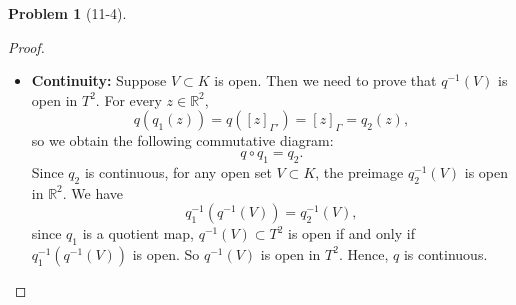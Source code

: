 \documentclass[11pt, a4paper]{article}
\theoremstyle{definition}
\newtheorem{prob}{Problem}
\newenvironment{problem}[1][]{\begin{prob}[#1]\normalfont}{\end{prob}\vspace{1.5em}}
\begin{document}
\begin{problem}[11-4]
\begin{proof}
\begin{itemize}
    \begin{enumerate}
        \item \textbf{$[z_1]_{\Gamma'} \subseteq [z_0]_{\Gamma'}$:} Take arbitrary element of $[z_1]_{\Gamma'}$, which is $\delta(z_1)$ for some $\delta \in \Gamma'$. Substituting $z_1 = \gamma'(z_0)$:
        $$\delta(z_1) = \delta(\gamma'(z_0)) = (\delta \gamma')(z_0)$$
        Since $\Gamma'$ is a group, $\delta \gamma' \in \Gamma'$, hence
        $$\delta(z_1) \in \Gamma' \cdot z_0 = [z_0]_{\Gamma'}$$
        \item \textbf{$[z_0]_{\Gamma'} \subseteq [z_1]_{\Gamma'}$:} Since $\Gamma'$ is a group, $\gamma'$ has an inverse $(\gamma')^{-1} \in \Gamma'$, and
        $$z_0 = (\gamma')^{-1}(z_1)$$
        (applying $(\gamma')^{-1}$ to both sides of $z_1 = \gamma'(z_0)$). This shows that $z_0$ can also be obtained from $z_1$ via an element of $\Gamma'$, so the same argument (with the roles of $z_0, z_1$ swapped) gives
        $$[z_0]_{\Gamma'} \subseteq [z_1]_{\Gamma'}$$
    \end{enumerate}
    So we have
    $$z_1 = \gamma'(z_0) \implies [z_0]_{\Gamma'} = [z_1]_{\Gamma'}.$$
    Conversely, if $[z_0]_{\Gamma'} = [z_1]_{\Gamma'}$. Since $z_1 \in [z_1]_{\Gamma'}$ (every point lies in its own orbit, taking $\delta = e$, the identity: 
    $e(z_1) = z_1$), and by hypothesis $[z_1]_{\Gamma'} = [z_0]_{\Gamma'}$, we get
    $$z_1 \in [z_0]_{\Gamma'}.$$
    By the definition of $[z_0]_{\Gamma'}$ above, $z_1 \in [z_0]_{\Gamma'}$ means there exists some $\gamma' \in \Gamma'$ such that
    $$z_1 = \gamma'(z_0),$$
    which is exactly the desired conclusion.Then we have
    $$[z_0]_{\Gamma'} = [z_1]_{\Gamma'} \implies z_1 = \gamma'(z_0).$$ 
    Since $\Gamma'=(2\mathbb{Z}\times \mathbb{Z})\subset \Gamma $, let 
    $z_0, z_1 \in \mathbb{R}^2$ are arbitrary satisfying $[z_0]_{\Gamma'} = [z_1]_{\Gamma'}$, where exists 
    $\gamma' \in \Gamma'\subset \Gamma $ such that $z_1 = \gamma'(z_0)$ which implies $[z_0]_{\Gamma} = [z_1]_{\Gamma}$.
    So $q([z_0]_{\Gamma'}) = q([z_1]_{\Gamma'})$, which $q$ is well-defined.

    \item[$2^\circ$] \textbf{Continuity:} Suppose $V \subset K $ is open. Then we need to prove that 
    $q^{-1}(V)$ is open in $T^2$. For every $z\in \mathbb{R}^2$,
    $$ q(q_1(z)) = q([z]_{\Gamma'}) = [z]_{\Gamma} = q_2(z), $$
    so we obtain the following commutative diagram: 
    $$ q\circ q_1 = q_2.$$
    Since $q_2$ is continuous, for any open set $V \subset K$, the preimage $q_2^{-1}(V)$ is open in 
    $\mathbb{R}^2$. We have
    $$q_1^{-1}(q^{-1}(V)) = q_2^{-1}(V),$$
    since $q_1$ is a quotient map, $q^{-1}(V)\subset T^2$ is open if and only if $q_1^{-1}(q^{-1}(V))$ is open. 
    So $q^{-1}(V)$ is open in $T^2$. Hence, $q$ is continuous.


\end{itemize}
\end{proof}
\end{problem}
\end{document}
